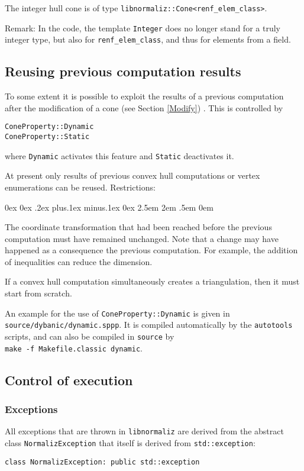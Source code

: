 \documentclass[12pt,a4paper]{scrartcl}
\newcounter{listi}
\newcommand{\stdli}{ \topsep0ex \partopsep0ex %
\parsep.2ex plus.1ex minus.1ex \itemsep0ex%
\leftmargin2.5em \labelwidth2em \labelsep.5em \rightmargin0em}%
\newenvironment{arab}{\begin{list}{\textup{(\arabic{listi})}}%
	{\usecounter{listi}\stdli}}{\end{list}}
\theoremstyle{definition}
\def\ttt{\texttt}
\begin{document}
\begin{small}
The integer hull cone is of type \verb|libnormaliz::Cone<renf_elem_class>|. 

Remark: In the code, the template \ttt{Integer} does no longer stand for a truly integer type, but also for \verb|renf_elem_class|, and thus for elements from a field.

\subsection{Reusing previous computation results}

To some extent it is possible to exploit the results of a previous computation after the modification of a cone (see Section \ref{Modify}) . This is controlled by 
\begin{Verbatim}
ConeProperty::Dynamic
ConeProperty::Static
\end{Verbatim}
where \verb|Dynamic| activates this feature and \verb|Static| deactivates it. 

At present only results of previous convex hull computations or vertex enumerations can be reused. Restrictions:
\begin{arab}
\item The coordinate transformation that had been reached before the previous computation must have remained unchanged. Note that a change may have happened as a consequence the previous computation. For example, the addition of inequalities can reduce the dimension.
\item If a convex hull computation simultaneously creates a triangulation, then it must start from scratch. 
\end{arab}

An example for the use of \verb|ConeProperty::Dynamic| is given in \verb|source/dybanic/dynamic.sppp|. It is compiled automatically by the \verb|autotools| scripts, and can also be compiled in \verb|source| by\\ \verb|make -f Makefile.classic dynamic|.

\subsection{Control of execution}

\subsubsection{Exceptions}

All exceptions that are thrown in \verb|libnormaliz| are derived from the abstract class \verb|NormalizException| that itself is derived from \verb|std::exception|:
\begin{Verbatim}
class NormalizException: public std::exception
\end{Verbatim}


\end{small}
\end{document}
